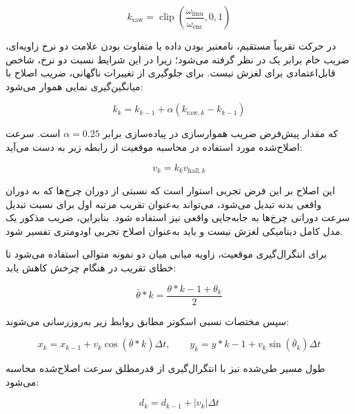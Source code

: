\begin{equation}
	k_{\mathrm{raw}} =
	\operatorname{clip}
	\left(
	\frac{\omega_{\mathrm{imu}}}
	{\omega_{\mathrm{enc}}},
	0,1
	\right)
	\label{eq:real_odom_raw_slip_factor}
\end{equation}

در حرکت تقریباً مستقیم، نامعتبر بودن داده  یا متفاوت بودن علامت دو نرخ زاویه‌ای، ضریب خام برابر یک در نظر گرفته می‌شود؛ زیرا در این شرایط نسبت دو نرخ، شاخص قابل‌اعتمادی برای لغزش نیست. برای جلوگیری از تغییرات ناگهانی، ضریب اصلاح با میانگین‌گیری نمایی هموار می‌شود:

\begin{equation}
	k_k =
	k_{k-1}
	+
	\alpha
	\left(
	k_{\mathrm{raw},k}-k_{k-1}
	\right)
	\label{eq:real_odom_slip_ema}
\end{equation}

که مقدار پیش‌فرض ضریب هموارسازی در پیاده‌سازی برابر $\alpha=0.25$ است. سرعت اصلاح‌شده مورد استفاده در محاسبه موقعیت از رابطه زیر به دست می‌آید:

\begin{equation}
	v_k =
	k_k v_{\mathrm{hall},k}
	\label{eq:real_odom_corrected_velocity}
\end{equation}

این اصلاح بر این فرض تجربی استوار است که نسبتی از دوران چرخ‌ها که به دوران واقعی بدنه تبدیل می‌شود، می‌تواند به‌عنوان تقریب مرتبه اول برای نسبت تبدیل سرعت دورانی چرخ‌ها به جابه‌جایی واقعی نیز استفاده شود. بنابراین، ضریب مذکور یک مدل کامل دینامیکی لغزش نیست و باید به‌عنوان اصلاح تجربی اودومتری تفسیر شود.

برای انتگرال‌گیری موقعیت، زاویه میانی میان دو نمونه متوالی استفاده می‌شود تا خطای تقریب در هنگام چرخش کاهش یابد:

\begin{equation}
	\bar{\theta}*k =
	\frac{\theta*{k-1}+\theta_k}{2}
	\label{eq:real_odom_mid_heading}
\end{equation}

سپس مختصات نسبی اسکوتر مطابق روابط زیر به‌روزرسانی می‌شوند:

\begin{equation}
	x_k =
	x_{k-1}
	+
	v_k\cos\left(\bar{\theta}*k\right)\Delta t,
	\qquad
	y_k =
	y*{k-1}
	+
	v_k\sin\left(\bar{\theta}_k\right)\Delta t
	\label{eq:real_odom_position_update}
\end{equation}

طول مسیر طی‌شده نیز با انتگرال‌گیری از قدرمطلق سرعت اصلاح‌شده محاسبه می‌شود:

\begin{equation}
	d_k =
	d_{k-1}
	+
	|v_k|\Delta t
	\label{eq:real_odom_path_update}
\end{equation}

